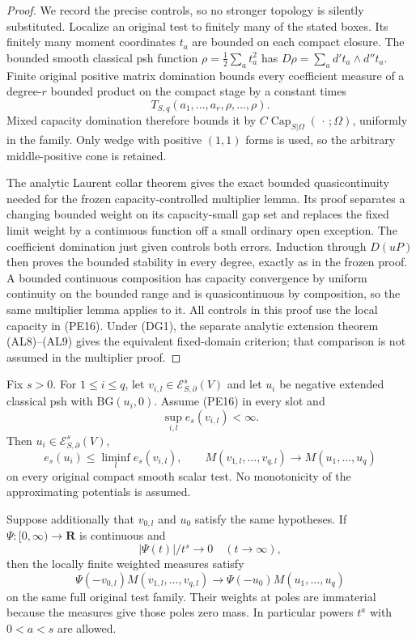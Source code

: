 \begin{proof}
We record the precise controls, so no stronger topology is
silently substituted. Localize an original test to finitely many
of the stated boxes. Its finitely many moment coordinates $t_a$
are bounded on each compact closure. The bounded smooth classical
psh function $\rho=\frac12\sum_a t_a^2$ has
$D\rho=\sum_a d't_a\wedge d''t_a$. Finite original positive
matrix domination bounds every coefficient measure of a degree-$r$
bounded product on the compact stage by a constant times
\[
          T_{S,q}(a_1,\ldots,a_r,\rho,\ldots,\rho).
\]
Mixed capacity domination therefore bounds it by
$C\operatorname{Cap}_{S|\Omega}(\,\cdot\,;\Omega)$, uniformly
in the family. Only wedge with positive $(1,1)$ forms is used,
so the arbitrary middle-positive cone is retained.

The analytic Laurent collar theorem gives the exact bounded
quasicontinuity needed for the frozen capacity-controlled
multiplier lemma. Its proof separates a changing bounded weight
on its capacity-small gap set and replaces the fixed limit weight
by a continuous function off a small ordinary open exception.
The coefficient domination just given controls both errors.
Induction through $D(uP)$ then proves the bounded stability in
every degree, exactly as in the frozen proof. A bounded continuous
composition has capacity convergence by uniform continuity on
the bounded range and is quasicontinuous by composition, so the
same multiplier lemma applies to it. All controls in this proof use
the local capacity in (PE16). Under (DG1), the separate analytic
extension theorem (AL8)--(AL9) gives the equivalent fixed-domain
criterion; that comparison is not assumed in the multiplier proof.
\end{proof}

\begin{theorem}
\label{thm:r11-power-capacity-stability}
Fix $s>0$. For $1\leq i\leq q$, let
$v_{i,l}\in\mathcal E^s_{S,\partial}(V)$ and let $u_i$ be
negative extended classical psh with $\mathrm{BG}(u_i,0)$.
Assume (PE16) in every slot and
\[
                         \sup_{i,l}e_s(v_{i,l})<\infty.
 \tag{PE17}
\]
Then $u_i\in\mathcal E^s_{S,\partial}(V)$,
\[
 e_s(u_i)\leq\liminf_l e_s(v_{i,l}),\qquad
 M(v_{1,l},\ldots,v_{q,l})\longrightarrow M(u_1,\ldots,u_q)
 \tag{PE18}
\]
on every original compact smooth scalar test. No monotonicity of
the approximating potentials is assumed.

Suppose additionally that $v_{0,l}$ and $u_0$ satisfy the same
hypotheses. If $\Psi:[0,\infty)\to\mathbf R$ is continuous and
\[
                         |\Psi(t)|/t^s\longrightarrow0
                                      \quad(t\to\infty),
 \tag{PE19}
\]
then the locally finite weighted measures satisfy
\[
 \Psi(-v_{0,l})M(v_{1,l},\ldots,v_{q,l})
        \longrightarrow\Psi(-u_0)M(u_1,\ldots,u_q)
 \tag{PE20}
\]
on the same full original test family. Their weights at poles
are immaterial because the measures give those poles zero mass.
In particular powers $t^a$ with $0<a<s$ are allowed.
\end{theorem}

